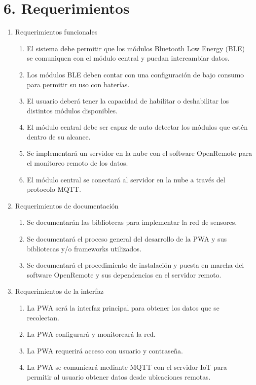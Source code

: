 \documentclass[
11pt, %
]{charter}
\begin{document}
\section{6. Requerimientos}
\label{sec:requerimientos}



\begin{enumerate}
	\item Requerimientos funcionales
		\begin{enumerate}
			\item El sistema debe permitir que los módulos Bluetooth Low Energy (BLE) se comuniquen con el módulo central y puedan intercambiar datos.
			\item Los módulos BLE deben contar con una configuración de bajo consumo para permitir su uso con baterías.
			\item El usuario deberá tener la capacidad de habilitar o deshabilitar los distintos módulos disponibles.
			\item El módulo central debe ser capaz de auto detectar los módulos que estén dentro de su alcance.
			\item Se implementará un servidor en la nube con el software OpenRemote para el monitoreo remoto de los datos.
			\item El módulo central se conectará al servidor en la nube a través del protocolo MQTT.
		\end{enumerate}
	\item Requerimientos de documentación
		\begin{enumerate}
			\item Se documentarán las bibliotecas para implementar la red de sensores. 
			\item Se documentará el proceso general del desarrollo de la PWA y sus bibliotecas y/o frameworks utilizados.
			\item Se documentará el procedimiento de instalación y puesta en marcha del software OpenRemote y sus dependencias en el servidor remoto.
		\end{enumerate}
	\item Requerimientos de la interfaz
		\begin{enumerate}
			\item La PWA será la interfaz principal para obtener los datos que se recolectan.
			\item La PWA configurará y monitoreará la red. 
			\item La PWA requerirá acceso con usuario y contraseña.
			\item  La PWA se comunicará mediante MQTT con el servidor IoT para permitir al usuario obtener datos desde ubicaciones remotas.

\end{enumerate}
\end{enumerate}
\end{document}
